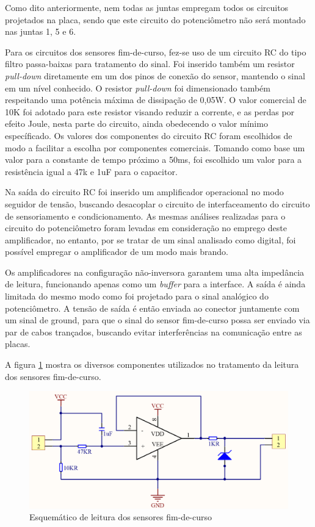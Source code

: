Como dito anteriormente, nem todas as juntas empregam todos os circuitos projetados
na placa, sendo que este circuito do potenciômetro não será montado nas juntas 1,
5 e 6.

Para os circuitos dos sensores fim-de-curso, fez-se uso de um circuito 
RC do tipo filtro passa-baixas para tratamento do sinal. 
Foi inserido também um resistor \textit{pull-down} diretamente 
em um dos pinos de conexão do sensor, mantendo o sinal em um nível 
conhecido. O resistor \textit{pull-down} foi dimensionado também respeitando
uma potência máxima de dissipação de 0,05W.
O valor comercial de 10K foi adotado para este resistor visando reduzir a
corrente, e as perdas por efeito Joule, nesta parte do circuito, 
ainda obedecendo o valor mínimo específicado. 
Os valores dos componentes do circuito RC foram escolhidos de modo a 
facilitar a escolha por componentes comerciais. Tomando como base um 
valor para a constante de tempo próximo a 50ms, foi escolhido um valor 
para a resistência igual a 47k e 1uF para o capacitor.

Na saída do circuito RC foi inserido um amplificador operacional no 
modo seguidor de tensão, buscando desacoplar o circuito de 
interfaceamento do circuito de sensoriamento e condicionamento. 
As mesmas análises realizadas para o circuito do potenciômetro foram 
levadas em consideração no emprego deste amplificador, no entanto, por 
se tratar de um sinal analisado como digital, foi possível empregar o 
amplificador de um modo mais brando.

Os amplificadores na configuração não-inversora garantem uma alta impedância 
de leitura, funcionando apenas como um \textit{buffer} para a interface.
A saída é ainda limitada do mesmo modo como foi projetado para o sinal
analógico do potenciômetro. 
A tensão de saída é então enviada ao conector 
juntamente com um sinal de ground, para que o sinal do sensor 
fim-de-curso possa ser enviado via par de cabos trançados, buscando evitar
interferências na comunicação entre as placas.

A figura \ref{fig:Esquematico-sensor-switch} mostra os diversos
componentes utilizados no tratamento da leitura dos sensores
fim-de-curso.

\begin{figure}[ht]
    \caption{Esquemático de leitura dos sensores fim-de-curso}    
    \begin{centering}

        \includegraphics[width=0.7\columnwidth]{images/pcbs/SensorPCB-Switch.png}
    
    \par\end{centering}

    \label{fig:Esquematico-sensor-switch}
\end{figure}

